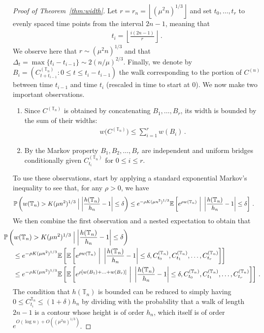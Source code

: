 \documentclass{article}
\newcommand{\pr}{\mathbb{P}}								%
\newcommand{\CProb}[2]{\pr\left(#1 \Bigm| #2\right)}	%
\newcommand{\E}{\mathbb{E}}								%
\newcommand{\Exp}[1]{\E\left[#1\right]}					%
\newcommand{\1}{\mathbbm{1}}								%
\theoremstyle{definition}
\numberwithin{equation}{section}
\newcommand{\T}{\mathbb T}
\newcommand{\floor}[1]{\left\lfloor #1\right\rfloor}
\begin{document}
\begin{proof}[Proof of Theorem~\ref{thm:width}]
    Let $r=r_n=\floor{(\mu^2n)^{1/3}}$ and set $t_0,\ldots,t_r$ to evenly spaced time points from the interval $2n-1$, meaning that
    \begin{align*}
        t_i=\floor{\frac{i(2n-1)}{r}}\,.
    \end{align*}
    We observe here that $r\sim(\mu^2n)^{1/3}$ and that $\Delta_t=\max\{t_i-t_{i-1}\}\sim2(n/\mu)^{2/3}$.
    Finally, we denote by $B_i=(C^{(\T_n)}_{t+t_{i-1}}:0\leq t\leq t_i-t_{i-1})$ the walk corresponding to the portion of $C^{(n)}$ between time $t_{i-1}$ and time $t_i$ (rescaled in time to start at $0$).
    We now make two important observations.
    \begin{enumerate}
        \item Since $C^{(\T_n)}$ is obtained by concatenating $B_1,\ldots,B_r$, its width is bounded by the sum of their widths:
        \begin{align*}
            w\big(C^{(\T_n)}\big)\leq\sum_{i=1}^rw(B_i)\,.
        \end{align*}
        \item By the Markov property $B_1,B_2,\ldots,B_r$ are independent and uniform bridges conditionally given $C^{(\T_n)}_{t_i}$ for $0\leq i\leq r$.
    \end{enumerate}
    To use these observations, start by applying a standard exponential Markov's inequality to see that, for any $\rho>0$, we have
    \begin{align*}
        \CProb{w(\T_n)>K(\mu n^2)^{1/3}}{\left|\frac{h(\T_n)}{h_n}-1\right|\leq\delta}
        &\leq e^{-\rho K(\mu n^2)^{1/3}}\Exp{e^{\rho w(\T_n)}~\bigg|~\left|\frac{h(\T_n)}{h_n}-1\right|\leq\delta}\,.
    \end{align*}
    We then combine the first observation and a nested expectation to obtain that
    \begin{align*}
        &\hspace{-0.5cm}\CProb{w(\T_n)>K(\mu n^2)^{1/3}}{\left|\frac{h(\T_n)}{h_n}-1\right|\leq\delta}\\
        &\leq e^{-\rho K(\mu n^2)^{1/3}}\Exp{\Exp{e^{\rho w(\T_n)}~\bigg|~\left|\frac{h(\T_n)}{h_n}-1\right|\leq\delta,C^{(\T_n)}_{t_0},C^{(\T_n)}_{t_1},\ldots,C^{(\T_n)}_{t_r}}}\\
        &\leq e^{-\rho K(\mu n^2)^{1/3}}\Exp{\Exp{e^{\rho\left[w(B_1)+\ldots+w(B_r)\right]}~\bigg|~\left|\frac{h(\T_n)}{h_n}-1\right|\leq\delta,C^{(\T_n)}_{t_0},C^{(\T_n)}_{t_1},\ldots,C^{(\T_n)}_{t_r}}}\,.
    \end{align*}
    The condition that $h(\T_n)$ is bounded can be reduced to simply having $0\leq C^{\T_n}_{t_i}\leq(1+\delta)h_n$ by dividing with the probability that a walk of length $2n-1$ is a contour whose height is of order $h_n$, which itself is of order $e^{O(\log n)+O((\mu^2n)^{1/3})}$.

\end{proof}
\end{document}
